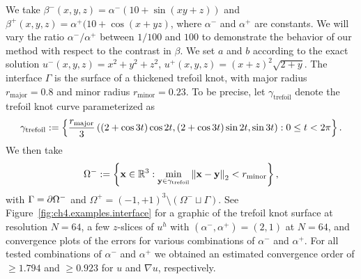 We take $\beta^-(x,y,z) = \alpha^- (10 + \sin(xy + z))$ and $\beta^+(x,y,z) = \alpha^+ (10 + \cos(x + yz)$, where $\alpha^-$ and $\alpha^+$ are constants. We will vary the ratio $\alpha^- / \alpha^+$ between $1/100$ and $100$ to demonstrate the behavior of our method with respect to the contrast in $\beta$. We set $a$ and $b$ according to the exact solution $u^-(x,y,z) = x^2 + y^2 + z^2$, $u^+(x,y,z) = (x + z)^2 \sqrt{2 + y}$. The interface $\Gamma$ is the surface of a thickened trefoil knot, with major radius $r_{\text{major}} = 0.8$ and minor radius $r_{\text{minor}} = 0.23$. To be precise, let $\gamma_{\text{trefoil}}$ denote the trefoil knot curve parameterized as
\begin{equation*}
\gamma_{\text{trefoil}} := \left\lbrace  \frac{r_{\text{major}}}{3} \left( (2 + \cos 3t) \cos 2t, (2 + \cos 3t) \sin 2t, \sin 3t \right) : 0 \leq t < 2\pi  \right\rbrace.
\end{equation*}
We then take
\begin{equation*}
\Omega^- := \left\lbrace  \mathbf{x} \in \mathbb{R}^3 : \min_{\mathbf{y} \in \gamma_{\text{trefoil}}} \left\lVert \mathbf{x} - \mathbf{y} \right\rVert_2 < r_{\text{minor}}  \right\rbrace,
\end{equation*}
with $\Gamma = \partial\Omega^-$ and $\Omega^+ = (-1,+1)^3 \setminus (\Omega^- \sqcup \Gamma)$. See Figure~\ref{fig:ch4.examples.interface} for a graphic of the trefoil knot surface at resolution $N = 64$, a few $z$-slices of $u^h$ with $(\alpha^-, \alpha^+) = (2,1)$ at $N = 64$, and convergence plots of the errors for various combinations of $\alpha^-$ and $\alpha^+$. For all tested combinations of $\alpha^-$ and $\alpha^+$ we obtained an estimated convergence order of $\geq 1.794$ and $\geq 0.923$ for $u$ and $\nabla u$, respectively.


